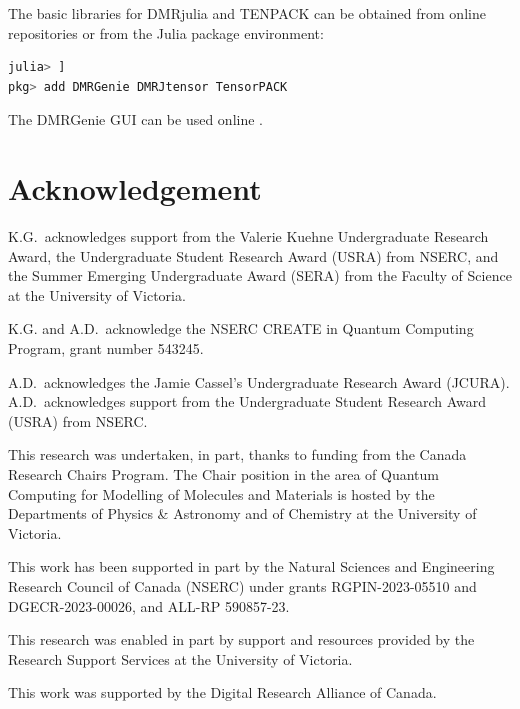 \documentclass{juliacon}
\begin{document}
The basic libraries for DMRjulia and TENPACK can be obtained from online repositories \cite{dmrjulia,tenpack} or from the Julia package environment:
\begin{lstlisting}[language = Julia]
julia> ]
pkg> add DMRGenie DMRJtensor TensorPACK
\end{lstlisting}

The DMRGenie GUI can be used online \cite{dmrgenie}.

\section{Acknowledgement}

K.G.~acknowledges support from the Valerie Kuehne Undergraduate Research Award, the Undergraduate Student Research Award (USRA) from NSERC, and the Summer Emerging Undergraduate Award (SERA) from the Faculty of Science at the University of Victoria. 

K.G. and A.D.~acknowledge the NSERC CREATE in Quantum Computing Program, grant number 543245.

A.D.~acknowledges the Jamie Cassel's Undergraduate Research Award (JCURA). A.D.~acknowledges support from the Undergraduate Student Research Award (USRA) from NSERC.

This research was undertaken, in part, thanks to funding from the Canada Research Chairs Program. The Chair position in the area of Quantum Computing for Modelling of Molecules and Materials is hosted by the Departments of Physics \& Astronomy and of Chemistry at the University of Victoria. 

This work has been supported in part by the Natural Sciences and Engineering Research Council of Canada (NSERC) under grants RGPIN-2023-05510 and DGECR-2023-00026, and ALL-RP 590857-23.

This research was enabled in part by support and resources provided by the Research Support Services at the University of Victoria.

This work was supported by the Digital Research Alliance of Canada.



\end{document}
